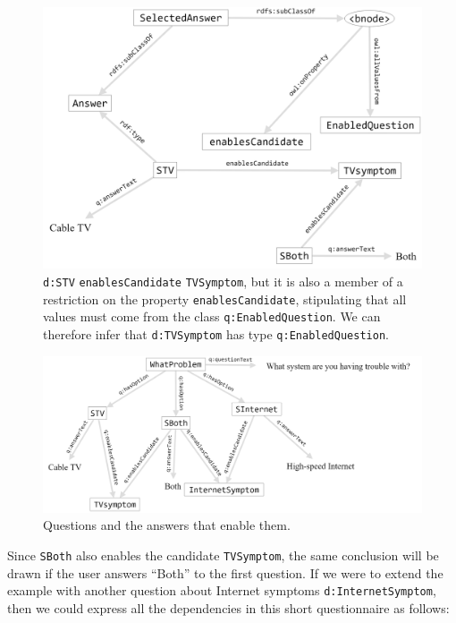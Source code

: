 \begin{figure}
\centering
\includegraphics[width=5in]{SWWOv3/media/ch12/figure12-4.png}
\caption{\texttt{d:STV} \texttt{enablesCandidate} \texttt{TVSymptom}, but it is also a member of a
restriction on the property \texttt{enablesCandidate}, stipulating that all
values must come from the class \texttt{q:EnabledQuestion}. We can therefore
infer that \texttt{d:TVSymptom} has type \texttt{q:EnabledQuestion}. 
}
\label{fig:ch12.04}
\end{figure}



\begin{figure}
\centering
\includegraphics[width=5in]{SWWOv3/media/ch12/figure12-5.png}
\caption{Questions and the answers that enable them.}
\label{fig:ch12.05}
\end{figure}



Since \texttt{SBoth} also enables the candidate \texttt{TVSymptom}, the same conclusion
will be drawn if the user answers ``Both'' to the first question. If we
were to extend the example with another question about Internet symptoms
\texttt{d:InternetSymptom}, then we could express all the dependencies in this
short questionnaire as follows:

